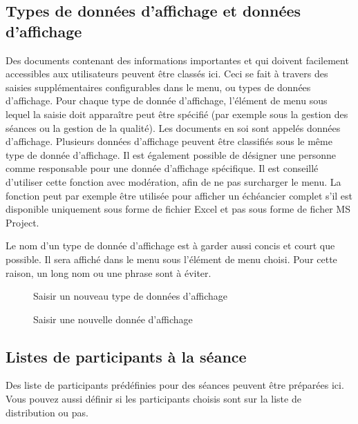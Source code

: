\subsection{Types de données d'affichage et données d'affichage}

Des documents contenant des informations importantes et qui doivent facilement accessibles aux utilisateurs peuvent être classés ici. Ceci se fait à travers des saisies supplémentaires configurables dans le menu, ou types de données d'affichage. Pour chaque type de donnée d'affichage, l'élément de menu sous lequel la saisie doit apparaître peut être spécifié (par exemple sous la gestion des séances ou la gestion de la qualité). Les documents en soi sont appelés données d'affichage. Plusieurs données d'affichage peuvent être classifiés sous le même type de donnée d'affichage. Il est également possible de désigner une personne comme responsable pour une donnée d'affichage spécifique. Il est conseillé d'utiliser cette fonction avec modération, afin de ne pas surcharger le menu. La fonction peut par exemple être utilisée pour afficher un échéancier complet s'il est disponible uniquement sous forme de fichier Excel et pas sous forme de ficher MS Project.

\vspace{\baselineskip}

Le nom d'un type de donnée d'affichage est à garder aussi concis et court que possible. Il sera affiché dans le menu sous l'élément de menu choisi. Pour cette raison, un long nom ou une phrase sont à éviter.

\begin{figure}[H]
\caption{Saisir un nouveau type de données d'affichage}
\end{figure}

\begin{figure}[H]
\caption{Saisir une nouvelle donnée d'affichage}
\end{figure}


\clearpage
\subsection{Listes de participants à la séance}

Des liste de participants prédéfinies pour des séances peuvent être préparées ici. Vous pouvez aussi définir si les participants choisis sont sur la liste de distribution ou pas.

